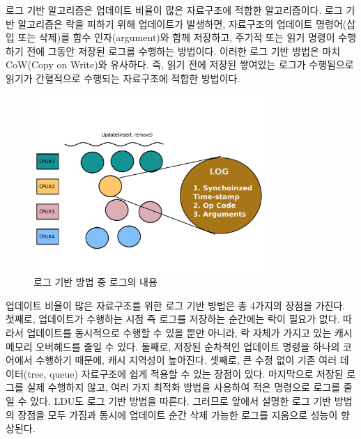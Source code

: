 
로그 기반 알고리즘은 업데이트 비율이 많은 자료구조에 적합한 알고리즘이다. 
로그 기반 알고리즘은 락을 피하기 위해 업데이트가 발생하면, 자료구조의 업데이트 
명령어(삽입 또는 삭제)를 함수 인자(argument)와 함께 저장하고, 주기적 또는 읽기 명령이
 수행하기 전에 그동안 저장된 로그를 수행하는 방법이다.
이러한 로그 기반 방법은 마치 CoW(Copy on Write)와 유사하다.
즉, 읽기 전에 저장된 쌓여있는 로그가 수행됨으로 읽기가 간혈적으로 수행되는 자료구조에 적합한 방법이다.



\begin{figure}[h]
    \centering
    \includegraphics[width=0.8\textwidth]{fig/oplog_log}
    \caption{로그 기반 방법 중 로그의 내용}
  \label{fig:oplog_log}
\end{figure}



업데이트 비율이 많은 자료구조를 위한 로그 기반 방법은 총 4가지의 장점을 가진다. 
첫째로, 업데이트가 수행하는 시점 즉 로그를 저장하는 순간에는 락이 필요가 없다. 
따라서 업데이트를 동시적으로 수행할 수 있을 뿐만 아니라, 락 자체가 가지고 있는 캐시 메모리 오버헤드를 
줄일 수 있다. 
둘째로, 저장된 순차적인 업데이트 명령을 하나의 코어에서 수행하기 때문에, 캐시 지역성이 높아진다.
셋째로, 큰 수정 없이 기존 여러 데이터(tree, queue) 자료구조에 쉽게 적용할 수 있는 장점이 있다.
마지막으로 저장된 로그를 실제 수행하지 않고, 여러 가지 최적화 방법을 사용하여 적은 
명령으로 로그를 줄일 수 있다. 
LDU도 로그 기반 방법을 따른다. 그러므로 앞에서 설명한 로그 기반 방법의 장점을 모두 가짐과 동시에
업데이트 순간 삭제 가능한 로그를 지움으로 성능이 향상된다.

